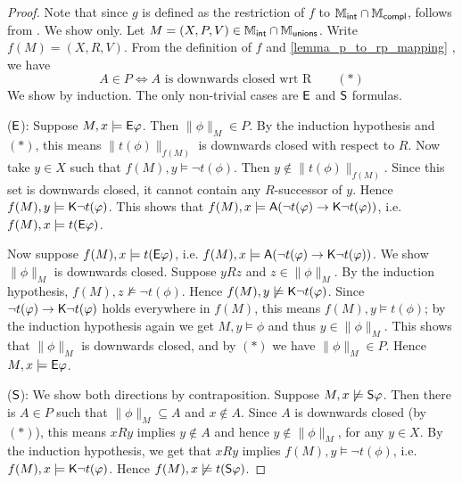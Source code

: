 \begin{proof}

    Note that since $g$ is defined as the restriction of $f$ to $\Mint \cap
    \Mcompl$,  follows from . We show
     only.
    Let $M = (X, P, V) \in \Mint \cap \Munions$. Write $f(M) =
    (X, R, V)$. From the definition of $f$ and
    \cref{lemma_p_to_rp_mapping} , we have
    \[
        A \in P \iff A \text{ is downwards closed wrt R} \qquad(*)
    \]
    We show  by induction. The only non-trivial cases are
    $\E$ and $\S$ formulas.

        ($\E$): Suppose $M, x \models \E\phi$. Then $\|\phi\|_M \in P$. By
              the induction hypothesis and $(*)$, this means
              $\|t(\phi)\|_{f(M)}$ is downwards closed with respect to $R$. Now
              take $y \in X$ such that $f(M), y \models \neg t(\phi)$. Then $y
              \notin \|t(\phi)\|_{f(M)}$. Since this set is downwards closed,
              it cannot contain any $R$-successor of $y.$ Hence $f(M), y
              \models \K\neg t(\phi)$. This shows that $f(M), x \models \A(\neg
              t(\phi) \limplies \K\neg t(\phi))$, i.e. $f(M), x \models
              t(\E\phi)$.

              Now suppose $f(M), x \models t(\E\phi)$, i.e. $f(M), x \models
              \A(\neg t(\phi) \limplies \K\neg t(\phi))$. We show $\|\phi\|_M$
              is downwards closed. Suppose $yRz$ and $z \in \|\phi\|_M$. By the
              induction hypothesis, $f(M), z \not\models \neg t(\phi)$. Hence
              $f(M), y \not\models \K\neg t(\phi)$. Since $\neg t(\phi)
              \limplies \K\neg t(\phi)$ holds everywhere in $f(M)$, this means
              $f(M), y \models t(\phi)$; by the induction hypothesis again we
              get $M, y \models \phi$ and thus $y \in \|\phi\|_M$. This shows
              that $\|\phi\|_M$ is downwards closed, and by $(*)$ we have
              $\|\phi\|_M \in P$.  Hence $M, x \models \E\phi$.

        ($\S$): We show both directions by contraposition. Suppose $M, x
              \not\models \S\phi$. Then there is $A \in P$ such that
              $\|\phi\|_M \subseteq A$ and $x \notin A$. Since $A$ is downwards
              closed (by $(*)$), this means $xRy$ implies $y \notin A$ and
              hence $y \notin \|\phi\|_M$, for any $y \in X$. By the induction
              hypothesis, we get that $xRy$ implies $f(M), y \models \neg
              t(\phi)$, i.e.  $f(M), x \models \K\neg t(\phi)$. Hence $f(M), x
              \not\models t(\S\phi)$.


\end{proof}
